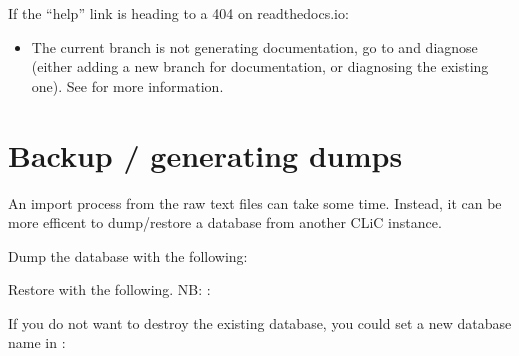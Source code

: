 \documentclass[letterpaper,10pt,english]{sphinxmanual}
\begin{document}
\sphinxAtStartPar
If the “help” link is heading to a 404 on readthedocs.io:
\begin{itemize}
\item {} 
\sphinxAtStartPar
The current branch is not generating documentation, go to  and diagnose (either adding a new branch for documentation, or diagnosing the existing one). See {\hyperref[\detokenize{advanced/development::doc}]{}} for more information.

\end{itemize}


\section{Back\sphinxhyphen{}up / generating dumps}
\label{\detokenize{advanced/production:back-up-generating-dumps}}
\sphinxAtStartPar
An import process from the raw text files can take some time.
Instead, it can be more efficent to dump/restore a database from another CLiC
instance.

\sphinxAtStartPar
Dump the database with the following:

\begin{sphinxVerbatim}[commandchars=\\\{\}]
 
\end{sphinxVerbatim}

\sphinxAtStartPar
Restore with the following. NB: :

\begin{sphinxVerbatim}[commandchars=\\\{\}]
 
\end{sphinxVerbatim}

\sphinxAtStartPar
If you do not want to destroy the existing database, you could set a new database name in :

\begin{sphinxVerbatim}[commandchars=\\\{\}]
   
\end{sphinxVerbatim}
\end{document}
